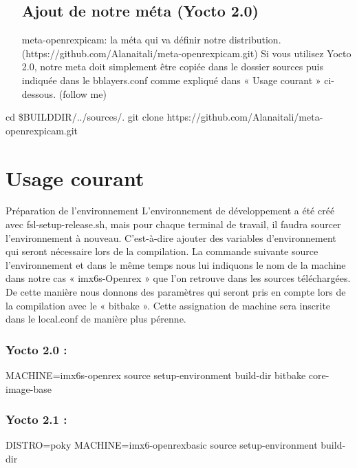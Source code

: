 \begin{itemize}
	\subsection{Ajout de notre méta (Yocto 2.0)}
	\item[meta-openrexpicam:] la méta qui va définir notre distribution.        (https://github.com/Alanaitali/meta-openrexpicam.git)
	Si vous utilisez Yocto 2.0, notre meta doit simplement être copiée dans le dossier sources puis indiquée dans le bblayers.conf comme expliqué dans « Usage courant » ci-dessous. (follow me)
\end{itemize}

\begin{tcolorbox}
	cd \$BUILDDIR/../sources/.
	git clone https://github.com/Alanaitali/meta-openrexpicam.git
\end{tcolorbox}

\section{Usage courant}
Préparation de l’environnement
L’environnement de développement a été créé avec fsl-setup-release.sh, mais pour chaque terminal de travail, il faudra sourcer l’environnement à nouveau. C’est-à-dire ajouter des variables d’environnement qui seront nécessaire lors de la compilation. La commande suivante source l’environnement et dans le même temps nous lui indiquons le nom de la machine dans notre cas « imx6s-Openrex » que l’on retrouve dans les sources téléchargées. De cette manière nous donnons des paramètres qui seront pris en compte lors de la compilation avec le « bitbake ». Cette assignation de machine sera inscrite dans le local.conf de manière plus pérenne.

\subsubsection*{Yocto 2.0 :}


\begin{tcolorbox}
	MACHINE=imx6s-openrex source setup-environment build-dir
	bitbake core-image-base
\end{tcolorbox}

\subsubsection*{Yocto 2.1 :}

\begin{tcolorbox}
	DISTRO=poky MACHINE=imx6-openrexbasic source setup-environment build-dir
\end{tcolorbox}

